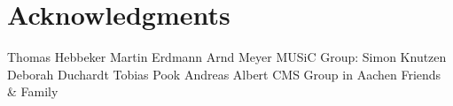 
\chapter*{Acknowledgments}
Thomas Hebbeker
Martin Erdmann
Arnd Meyer
MUSiC Group:
	Simon Knutzen
	Deborah Duchardt
	Tobias Pook
	Andreas Albert
CMS Group in Aachen
Friends \& Family